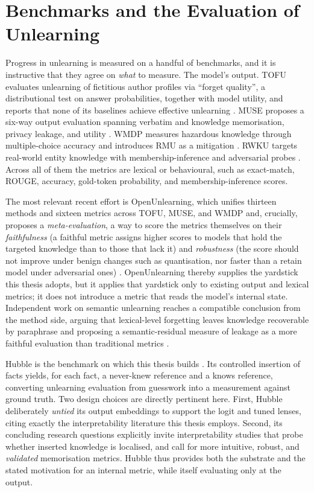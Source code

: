 \section{Benchmarks and the Evaluation of Unlearning}
\label{sec:rw-benchmarks}

Progress in unlearning is measured on a handful of benchmarks, and it is instructive that they agree on
\emph{what} to measure. The model's output. TOFU evaluates unlearning of fictitious author profiles via
``forget quality'', a distributional test on answer probabilities, together with model utility, and reports
that none of its baselines achieve effective unlearning \citep{maini2024tofu}. MUSE proposes a six-way
output evaluation spanning verbatim and knowledge memorisation, privacy leakage, and utility
\citep{shi2024muse}. WMDP measures hazardous knowledge through multiple-choice accuracy and introduces RMU
as a mitigation \citep{li2024wmdp}. RWKU targets real-world entity knowledge with membership-inference and
adversarial probes \citep{jin2024rwku}. Across all of them the metrics are lexical or behavioural, such as
exact-match, ROUGE, accuracy, gold-token probability, and membership-inference scores.

The most relevant recent effort is OpenUnlearning, which unifies thirteen methods and sixteen metrics across
TOFU, MUSE, and WMDP and, crucially, proposes a \emph{meta-evaluation}, a way to score the metrics
themselves on their \emph{faithfulness} (a faithful metric assigns higher scores to models that hold the
targeted knowledge than to those that lack it) and \emph{robustness} (the score should not improve under
benign changes such as quantisation, nor faster than a retain model under adversarial ones)
\citep{dorna2025openunlearning}. OpenUnlearning thereby supplies the yardstick this thesis adopts, but it
applies that yardstick only to existing output and lexical metrics; it does not introduce a metric that
reads the model's internal state. Independent work on semantic unlearning reaches a compatible conclusion
from the method side, arguing that lexical-level forgetting leaves knowledge recoverable by paraphrase and
proposing a semantic-residual measure of leakage as a more faithful evaluation than traditional metrics
\citep{semantic2025unlearning}.

Hubble is the benchmark on which this thesis builds \citep{allegro2025hubble}. Its controlled insertion of
facts yields, for each fact, a never-knew reference and a knows reference, converting unlearning evaluation
from guesswork into a measurement against ground truth. Two design choices are directly pertinent here.
First, Hubble deliberately \emph{untied} its output embeddings to support the logit and tuned lenses,
citing exactly the interpretability literature this thesis employs. Second, its concluding research
questions explicitly invite interpretability studies that probe whether inserted knowledge is localised, and
call for more intuitive, robust, and \emph{validated} memorisation metrics. Hubble thus provides both the
substrate and the stated motivation for an internal metric, while itself evaluating only at the output.

